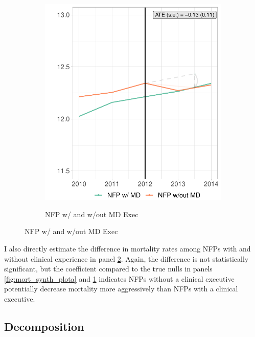 \documentclass[12pt]{article}
\begin{document}
\begin{figure}
\begin{subfigure}[b]{0.45\textwidth}
         \label{fig:mort_synth_plotc}
     \end{subfigure}
     \hfill
     \begin{subfigure}[b]{0.45\textwidth}
         \centering
         \caption{NFP w/ and w/out MD Exec}
         \includegraphics[width=\textwidth]{Objects/mort_md_nomd_synth_graph.pdf}
         \label{fig:mort_synth_plotd}
     \end{subfigure}
        \label{fig:mort_synth_plot}
    \end{figure}

    I also directly estimate the difference in mortality rates among NFPs with and without clinical experience in panel \ref{fig:mort_synth_plotd}. Again, the difference is not statistically significant, but the coefficient compared to the true nulls in panels \ref{fig:mort_synth_plota} and \ref{fig:mort_synth_plotc} indicates NFPs without a clinical executive potentially decrease mortality more aggressively than NFPs with a clinical executive. 

    \subsection{Decomposition}
\end{document}
